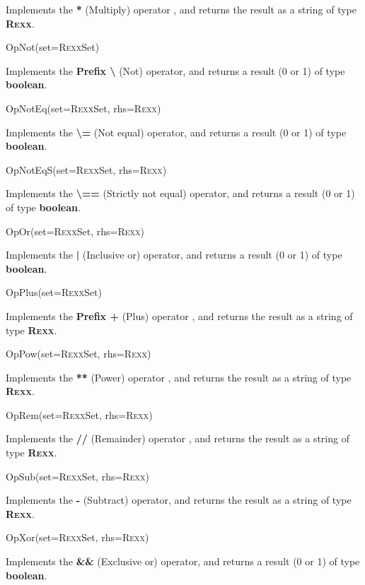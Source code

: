 \begin{description}
Implements the \nr{} \textbf{\textbf{*}} (Multiply) operator
, and returns the result as a string of type \textbf{R\textsc{exx}}.
\item{OpNot(set=R\textsc{exx}Set)}

Implements the \nr{} \textbf{\textbf{Prefix \textbackslash }} (Not)
operator, and returns a result (0 or 1) of type \textbf{boolean}.
\item{OpNotEq(set=R\textsc{exx}Set, rhs=R\textsc{exx})}

Implements the \nr{} \textbf{\textbf{\textbackslash =}} (Not equal)
operator, and returns a result (0 or 1) of type \textbf{boolean}.
\item{OpNotEqS(set=R\textsc{exx}Set, rhs=R\textsc{exx})}

Implements the \nr{} \textbf{\textbf{\textbackslash ==}} (Strictly not
equal) operator, and returns a result (0 or 1) of
type \textbf{boolean}.
\item{OpOr(set=R\textsc{exx}Set, rhs=R\textsc{exx})}

Implements the \nr{} \textbf{\textbf{|}} (Inclusive or)
operator, and returns a result (0 or 1) of type \textbf{boolean}.
\item{OpPlus(set=R\textsc{exx}Set)}

Implements the \nr{} \textbf{\textbf{Prefix +}} (Plus) operator
, and returns the result as a string of type \textbf{R\textsc{exx}}.
\item{OpPow(set=R\textsc{exx}Set, rhs=R\textsc{exx})}

Implements the \nr{} \textbf{\textbf{**}} (Power) operator
, and returns the result as a string of type \textbf{R\textsc{exx}}.
\item{OpRem(set=R\textsc{exx}Set, rhs=R\textsc{exx})}

Implements the \nr{} \textbf{\textbf{//}} (Remainder) operator
, and returns the result as a string of type \textbf{R\textsc{exx}}.
\item{OpSub(set=R\textsc{exx}Set, rhs=R\textsc{exx})}

Implements the \nr{} \textbf{\textbf{-}} (Subtract) operator,
and returns the result as a string of type \textbf{R\textsc{exx}}.
\item{OpXor(set=R\textsc{exx}Set, rhs=R\textsc{exx})}

Implements the \nr{} \textbf{\textbf{\&\&}} (Exclusive or)
operator, and returns a result (0 or 1) of
type \textbf{boolean}.
\end{description}
